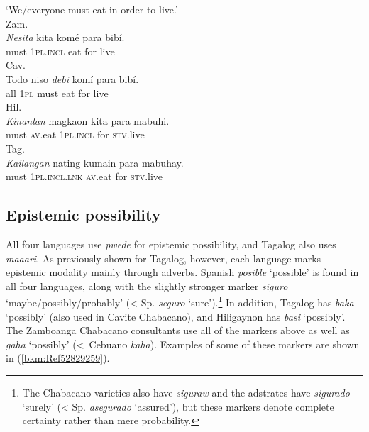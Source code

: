 \documentclass[output=paper,colorlinks,citecolor=brown]{langscibook}
\begin{document}
\ea
{\label{bkm:Ref52827925}‘We/everyone must eat in order to live.’}\\
\ea
{Zam.}\\
\gll \textit{Nesita} kita komé para bibí.\\
     must 1\textsc{pl.incl} eat for live\\
\ex
{Cav.}\\
\gll Todo niso \textit{debi} komí para bibí.\\
     all 1\textsc{pl} must eat for live\\
\ex
{Hil.}\\
\gll \textit{Kinanlan} magkaon kita para mabuhi.\\
     must \textsc{av}.eat 1\textsc{pl.incl} for \textsc{stv}.live\\
\ex
{Tag.}\\
\gll \textit{Kailangan} nating kumain para mabuhay.\\
     must 1\textsc{pl.incl.lnk} \textsc{av}.eat for \textsc{stv}.live\\
\z
\z

\subsection{Epistemic possibility}

All four languages use \textit{pwede} for epistemic possibility, and Tagalog also uses \textit{maaari}. As previously shown for Tagalog, however, each language marks epistemic modality mainly through adverbs. Spanish \textit{posible} ‘possible’ is found in all four languages, along with the slightly stronger marker \textit{siguro} ‘maybe/possibly/probably’ (< Sp. \textit{seguro} ‘sure’).\footnote{The Chabacano varieties also have \textit{siguraw} and the adstrates have \textit{sigurado} ‘surely’ (< Sp. \textit{asegurado} ‘assured’), but these markers denote complete certainty rather than mere probability.} In addition, Tagalog has \textit{baka} ‘possibly’ (also used in Cavite Chabacano), and Hiligaynon has \textit{basi} ‘possibly’. The Zamboanga Chabacano consultants use all of the markers above as well as \textit{gaha} ‘possibly’ (<~Cebuano \textit{kaha}). Examples of some of these markers are shown in (\ref{bkm:Ref52829259}).
\end{document}
